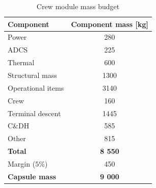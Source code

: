 \begin{table}[ht]
\centering
\caption{Crew module mass budget}
\label{tab:crewmass}
\begin{tabular}{|l|c|}
\hline
{\bf Component}    & {\bf Component mass {[}kg{]}} \\ \hline \hline
Power              & 280                           \\ \hline
 ADCS        &  225                     \\ \hline
Thermal            & 600                           \\ \hline
Structural mass    & 1300                          \\ \hline
Operational items  & 3140                          \\ \hline
Crew               & 160                           \\ \hline
Terminal descent   & 1445                          \\ \hline
C\&DH              & 585                           \\ \hline 
Other    & 815                          \\ \hline \hline
\textbf{Total}    & \textbf{8 550}                          \\ \hline \hline
Margin ($5\%$)  & 450                        \\ \hline \hline
{\bf Capsule mass} & {\bf 9 000}                    \\ \hline
\end{tabular}
\end{table}


